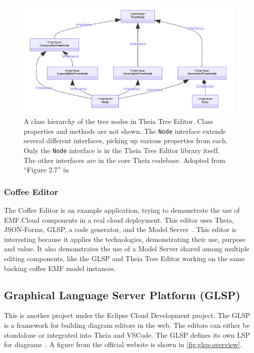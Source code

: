 \begin{figure}[htbp]  %
  \centering
  \includegraphics[width=\textwidth]{figures/pre-project/theia-tree-editor-node.png}
  \caption[Class Hierarchy of Theia Tree Editor Nodes]{A class hierarchy of the tree nodes in Theia Tree Editor. Class properties and methods are not shown. The \texttt{Node} interface extends several different interfaces, picking up various properties from each. Only the \texttt{Node} interface is in the Theia Tree Editor library itself. The other interfaces are in the core \gls{Theia} codebase. Adopted from ``Figure 2.7'' in \cite[p.~15]{rekstadModelingEnvironmentCloud2020}}\label{fig:theia-tree-editor-nodes}
\end{figure}

\subsubsection{Coffee Editor}
The Coffee Editor is an example application, trying to demonstrate the use of EMF.Cloud components in a real \gls{cloud} deployment.
This editor uses \gls{Theia}, JSON-Forms, \acrshort{GLSP}, a code generator, and the Model Server~\cite{foundationEMFCloud}.
This editor is interesting because it applies the technologies, demonstrating their use, purpose and value.
It also demonstrates the use of a Model Server shared among multiple editing components, like the GLSP and Theia Tree Editor working on the same backing coffee \acrshort{EMF} model instances.

\subsection{Graphical Language Server Platform (GLSP)}\label{sec:glsp}

This is another project under the Eclipse Cloud Development project.
The \acrfull{GLSP} is a framework for building diagram editors in the web.
The editors can either be standalone or integrated into \gls{Theia} and \gls{VSCode}.
The \acrshort{GLSP} defines its own \acrfull{LSP} for diagrams~\cite{eclipsefoundationGLSP2020}.
A figure from the official website is shown in \cref{fig:glsp-overview}.\\

